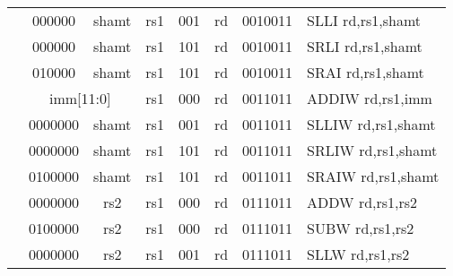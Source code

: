 \begin{table}[p]
\begin{small}
\begin{center}
\begin{tabular}{p{0in}p{0.4in}p{0.05in}p{0.05in}p{0.05in}p{0.05in}p{0.4in}p{0.6in}p{0.4in}p{0.6in}p{0.7in}l}
&
\multicolumn{3}{|c|}{000000} &
\multicolumn{3}{c|}{shamt} &
\multicolumn{1}{c|}{rs1} &
\multicolumn{1}{c|}{001} &
\multicolumn{1}{c|}{rd} &
\multicolumn{1}{c|}{0010011} & SLLI rd,rs1,shamt \\
\cline{2-11}
  

&
\multicolumn{3}{|c|}{000000} &
\multicolumn{3}{c|}{shamt} &
\multicolumn{1}{c|}{rs1} &
\multicolumn{1}{c|}{101} &
\multicolumn{1}{c|}{rd} &
\multicolumn{1}{c|}{0010011} & SRLI rd,rs1,shamt \\
\cline{2-11}
  

&
\multicolumn{3}{|c|}{010000} &
\multicolumn{3}{c|}{shamt} &
\multicolumn{1}{c|}{rs1} &
\multicolumn{1}{c|}{101} &
\multicolumn{1}{c|}{rd} &
\multicolumn{1}{c|}{0010011} & SRAI rd,rs1,shamt \\
\cline{2-11}
  

&
\multicolumn{6}{|c|}{imm[11:0]} &
\multicolumn{1}{c|}{rs1} &
\multicolumn{1}{c|}{000} &
\multicolumn{1}{c|}{rd} &
\multicolumn{1}{c|}{0011011} & ADDIW rd,rs1,imm \\
\cline{2-11}
  

&
\multicolumn{4}{|c|}{0000000} &
\multicolumn{2}{c|}{shamt} &
\multicolumn{1}{c|}{rs1} &
\multicolumn{1}{c|}{001} &
\multicolumn{1}{c|}{rd} &
\multicolumn{1}{c|}{0011011} & SLLIW rd,rs1,shamt \\
\cline{2-11}
  

&
\multicolumn{4}{|c|}{0000000} &
\multicolumn{2}{c|}{shamt} &
\multicolumn{1}{c|}{rs1} &
\multicolumn{1}{c|}{101} &
\multicolumn{1}{c|}{rd} &
\multicolumn{1}{c|}{0011011} & SRLIW rd,rs1,shamt \\
\cline{2-11}
  

&
\multicolumn{4}{|c|}{0100000} &
\multicolumn{2}{c|}{shamt} &
\multicolumn{1}{c|}{rs1} &
\multicolumn{1}{c|}{101} &
\multicolumn{1}{c|}{rd} &
\multicolumn{1}{c|}{0011011} & SRAIW rd,rs1,shamt \\
\cline{2-11}
  

&
\multicolumn{4}{|c|}{0000000} &
\multicolumn{2}{c|}{rs2} &
\multicolumn{1}{c|}{rs1} &
\multicolumn{1}{c|}{000} &
\multicolumn{1}{c|}{rd} &
\multicolumn{1}{c|}{0111011} & ADDW rd,rs1,rs2 \\
\cline{2-11}
  

&
\multicolumn{4}{|c|}{0100000} &
\multicolumn{2}{c|}{rs2} &
\multicolumn{1}{c|}{rs1} &
\multicolumn{1}{c|}{000} &
\multicolumn{1}{c|}{rd} &
\multicolumn{1}{c|}{0111011} & SUBW rd,rs1,rs2 \\
\cline{2-11}
  

&
\multicolumn{4}{|c|}{0000000} &
\multicolumn{2}{c|}{rs2} &
\multicolumn{1}{c|}{rs1} &
\multicolumn{1}{c|}{001} &
\multicolumn{1}{c|}{rd} &
\multicolumn{1}{c|}{0111011} & SLLW rd,rs1,rs2 \\
\cline{2-11}
  


\end{tabular}
\end{center}
\end{small}
\end{table}
